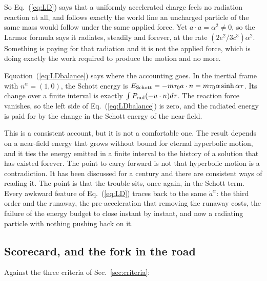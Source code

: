 \documentclass[preprint]{aastex701}
\newcommand{\taunought}{\tau_0}
\begin{document}
So Eq.~(\ref{eq:LD}) says that a uniformly accelerated charge feels no
radiation reaction at all, and follows exactly the world line an uncharged
particle of the same mass would follow under the same applied force. Yet
$a\cdot a = \alpha^2\ne0$, so the Larmor formula says it radiates, steadily and
forever, at the rate $(2e^2/3c^3)\alpha^2$. Something is paying for that
radiation and it is not the applied force, which is doing exactly the work
required to produce the motion and no more.

Equation~(\ref{eq:LDbalance}) says where the accounting goes. In the inertial
frame with $n^\alpha=(1,0)$, the Schott energy is
$E_{\rm Schott}=-m\taunought a\cdot n=m\taunought\alpha\sinh\alpha\tau$. Its
change over a finite interval is exactly
$\int P_{\rm rad}(-u\cdot n)d\tau$. The reaction force vanishes, so the left
side of Eq.~(\ref{eq:LDbalance}) is zero, and the radiated energy is paid for
by the change in the Schott energy of the near field.

This is a consistent account, but it is not a comfortable one. The result
depends on a near-field energy that grows without bound for eternal hyperbolic
motion, and it ties the energy emitted in a finite interval to the history of a
solution that has existed forever. The point to carry forward is not that
hyperbolic motion is a contradiction. It has been discussed for a century and
there are consistent ways of reading it. The point is that the trouble sits,
once again, in the Schott term. Every awkward feature of Eq.~(\ref{eq:LD})
traces back to the same $\dot a^\alpha$: the third order and the runaway, the
pre-acceleration that removing the runaway costs, the failure of the energy
budget to close instant by instant, and now a radiating particle with nothing
pushing back on it.

\subsection{Scorecard, and the fork in the road}
\label{sec:scorecard}

Against the three criteria of Sec.~\ref{sec:criteria}:
\end{document}

